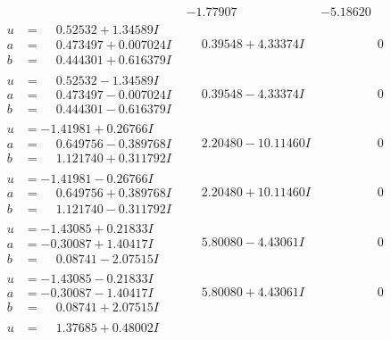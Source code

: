 \documentclass[1p]{elsarticle_modified}
\theoremstyle{definition}
\begin{document}
$$\begin{array}{c|c|c}
 & -1.77907\phantom{ +0.000000I} & -5.18620\phantom{ +0.000000I} \\ \hline\begin{aligned}
u &= \phantom{-}0.52532 + 1.34589 I \\
a &= \phantom{-}0.473497 + 0.007024 I \\
b &= \phantom{-}0.444301 + 0.616379 I\end{aligned}
 & \phantom{-}0.39548 + 4.33374 I & \phantom{-0.000000 } 0 \\ \hline\begin{aligned}
u &= \phantom{-}0.52532 - 1.34589 I \\
a &= \phantom{-}0.473497 - 0.007024 I \\
b &= \phantom{-}0.444301 - 0.616379 I\end{aligned}
 & \phantom{-}0.39548 - 4.33374 I & \phantom{-0.000000 } 0 \\ \hline\begin{aligned}
u &= -1.41981 + 0.26766 I \\
a &= \phantom{-}0.649756 - 0.389768 I \\
b &= \phantom{-}1.121740 + 0.311792 I\end{aligned}
 & \phantom{-}2.20480 - 10.11460 I & \phantom{-0.000000 } 0 \\ \hline\begin{aligned}
u &= -1.41981 - 0.26766 I \\
a &= \phantom{-}0.649756 + 0.389768 I \\
b &= \phantom{-}1.121740 - 0.311792 I\end{aligned}
 & \phantom{-}2.20480 + 10.11460 I & \phantom{-0.000000 } 0 \\ \hline\begin{aligned}
u &= -1.43085 + 0.21833 I \\
a &= -0.30087 + 1.40417 I \\
b &= \phantom{-}0.08741 - 2.07515 I\end{aligned}
 & \phantom{-}5.80080 - 4.43061 I & \phantom{-0.000000 } 0 \\ \hline\begin{aligned}
u &= -1.43085 - 0.21833 I \\
a &= -0.30087 - 1.40417 I \\
b &= \phantom{-}0.08741 + 2.07515 I\end{aligned}
 & \phantom{-}5.80080 + 4.43061 I & \phantom{-0.000000 } 0 \\ \hline\begin{aligned}
u &= \phantom{-}1.37685 + 0.48002 I \\

\end{aligned}
\end{array}$$
\end{document}
